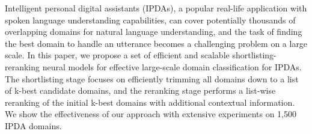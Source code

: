 Intelligent personal digital assistants (IPDAs), a popular real-life application with spoken language understanding capabilities, can cover potentially thousands of overlapping domains for natural language understanding, and the task of finding the best domain to handle an utterance becomes a challenging problem on a large scale. In this paper, we propose a set of efficient and scalable shortlisting-reranking neural models for effective large-scale domain classification for IPDAs. The shortlisting stage focuses on efficiently trimming all domains down to a list of k-best candidate domains, and the reranking stage performs a list-wise reranking of the initial k-best domains with additional contextual information. We show the effectiveness of our approach with extensive experiments on 1,500 IPDA domains.
